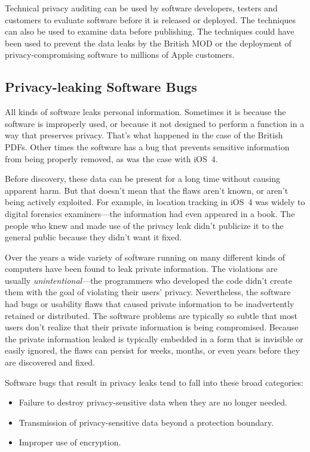 Technical privacy auditing can be used by software developers, testers
and customers to evaluate software before it is released or
deployed. The techniques can also be used to examine data before
publishing. The techniques could have been used to prevent the data
leaks by the British MOD or the deployment of privacy-compromising
software to millions of Apple customers.

\subsection{Privacy-leaking Software Bugs}

All kinds of software leaks personal information. Sometimes it is
because the software is improperly used, or because it not designed
to perform a function in a way that preserves privacy. That's what
happened in the case of the British PDFs. Other times the software has
a bug that prevents sensitive information from being properly
removed, as was the case with iOS~4.

Before discovery, these data can be present for a long time without
causing apparent harm. But that doesn't mean that the flaws aren't
known, or aren't being actively exploited. For example, in location
tracking in iOS~4 was widely to digital forensics examiners---the
information had even appeared in a book. The people who knew and made
use of the privacy leak didn't publicize it to the general public
because they didn't want it fixed.  

Over the years a wide variety of software running on many different
kinds of computers have been found to leak private information.  The
violations are usually  
\emph{unintentional}---the programmers who developed the code didn't
create them with the goal of violating their users'
privacy. Nevertheless, the software 
had bugs or usability flaws that caused private information to be
inadvertently retained or distributed. The software problems are
typically so subtle that most users don't realize that their private
information is being compromised. Because the private information
leaked is typically embedded in a form that is invisible or easily
ignored, the flaws can persist for weeks, months, or even years before
they are discovered and fixed.

Software bugs that result in privacy leaks tend to fall into these
broad categories:

\begin{itemize}
\item Failure to destroy privacy-sensitive data when they are no longer needed.
\item Transmission of privacy-sensitive data beyond a protection boundary. 
\item Improper use of encryption.
\end{itemize}

